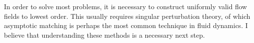 \documentclass[thesis.tex]{subfiles}
\begin{document}
In order to solve most problems, it is necessary to construct uniformly valid flow fields to lowest order. This usually requires singular perturbation theory, of which asymptotic matching is perhaps the most common technique in fluid dynamics. I believe that understanding these methods is a necessary next step.
\end{document}
